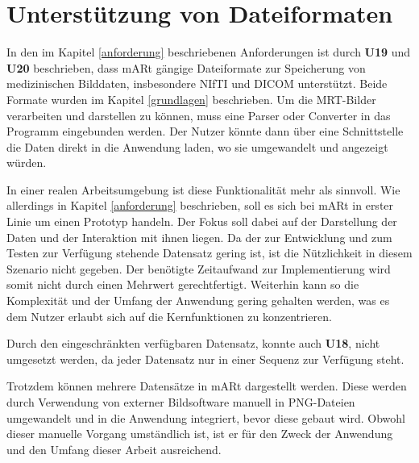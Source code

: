 \section{Unterstützung von Dateiformaten} 

In den im Kapitel \ref{anforderung} beschriebenen Anforderungen ist durch \textbf{U19} und \textbf{U20} beschrieben, dass mARt gängige Dateiformate zur Speicherung von medizinischen Bilddaten, insbesondere NIfTI und DICOM unterstützt. Beide Formate wurden im Kapitel \ref{grundlagen} beschrieben. 
Um die MRT-Bilder verarbeiten und darstellen zu können, muss eine Parser oder Converter in das Programm eingebunden werden. 
Der Nutzer könnte dann über eine Schnittstelle die Daten direkt in die Anwendung laden, wo sie umgewandelt und angezeigt würden. 

In einer realen Arbeitsumgebung ist diese Funktionalität mehr als sinnvoll. Wie allerdings in Kapitel \ref{anforderung} beschrieben, soll es sich bei mARt in erster Linie um einen Prototyp handeln.
Der Fokus soll dabei auf der Darstellung der Daten und der Interaktion mit ihnen liegen. Da der zur Entwicklung und zum Testen zur Verfügung stehende Datensatz gering ist, ist die Nützlichkeit in diesem Szenario nicht gegeben. Der benötigte Zeitaufwand zur Implementierung wird somit nicht durch einen Mehrwert gerechtfertigt.
Weiterhin kann so die Komplexität und der Umfang der Anwendung gering gehalten werden, was es dem Nutzer erlaubt sich auf die Kernfunktionen zu konzentrieren. 

Durch den eingeschränkten verfügbaren Datensatz, konnte auch \textbf{U18}, nicht umgesetzt werden, da jeder Datensatz nur in einer Sequenz zur Verfügung steht.

Trotzdem können mehrere Datensätze in mARt dargestellt werden. Diese werden durch Verwendung von externer Bildsoftware manuell in PNG-Dateien umgewandelt und in die Anwendung integriert, bevor diese gebaut wird. 
Obwohl dieser manuelle Vorgang umständlich ist, ist er für den Zweck der Anwendung und den Umfang dieser Arbeit ausreichend.
